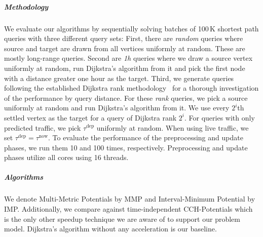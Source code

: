 \documentclass[a4paper,UKenglish,cleveref, autoref, thm-restate,anonymous]{lipics-v2021}
\newcommand*{\tdep}{\tau^{\operatorname{dep}}}
\begin{document}

\subparagraph{Methodology}
We evaluate our algorithms by sequentially solving batches of 100\,K shortest path queries with three different query sets:
First, there are \emph{random} queries where source and target are drawn from all vertices uniformly at random.
These are mostly long-range queries.
Second are \emph{1h} queries where we draw a source vertex uniformly at random, run Dijkstra's algorithm from it and pick the first node with a distance greater one hour as the target.
Third, we generate queries following the established Dijkstra rank methodology~\cite{ss-hhhes-05} for a thorough investigation of the performance by query distance.
For these \emph{rank} queries, we pick a source uniformly at random and run Dijkstra's algorithm from it.
We use every $2^{i}$th settled vertex as the target for a query of Dijkstra rank $2^i$.
For queries with only predicted traffic, we pick $\tdep$ uniformly at random.
When using live traffic, we set $\tdep = \tau^{\operatorname{now}}$.
To evaluate the performance of the preprocessing and update phases, we run them 10 and 100 times, respectively.
Preprocessing and update phases utilize all cores using 16 threads.

\subparagraph{Algorithms}
We denote Multi-Metric Potentials by MMP and Interval-Minimum Potential by IMP.
Additionally, we compare against time-independent CCH-Potentials which is the only other speedup technique we are aware of to support our problem model.
Dijkstra's algorithm without any acceleration is our baseline.
\end{document}
